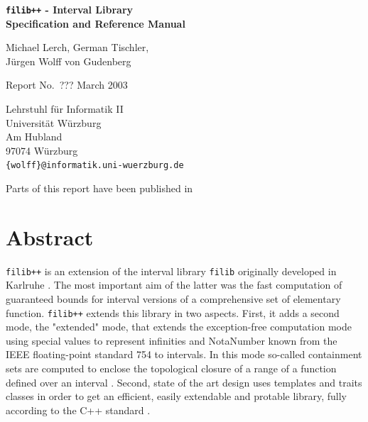 \documentclass{report}
\begin{document}
\begin{titlepage}
\setcounter{page}{0}

\vspace*{5cm}


\hspace{2.25cm}
\begin{minipage}{11.6cm}
\begin{center}
{\LARGE\bf \texttt{filib++} -   Interval Library \\
	  Specification and Reference Manual\\ }

\vspace*{0.9cm}

{\Large\sf Michael Lerch, German Tischler,\\ J\"urgen Wolff von Gudenberg}

\vspace*{1cm}

\hspace*{1.5cm} Report No.\ ??? \hfill March 2003 \hspace*{1.5cm} 


\vspace*{4.5cm}
Lehrstuhl f\"ur Informatik II\\
Universit\"at W\"urzburg\\
Am Hubland\\
97074 W\"urzburg\\[3mm]
{\tt \{wolff\}@informatik.uni-wuerzburg.de}
\end{center}
\vspace*{2cm}
Parts of this report have
	  been published in \cite{rnc, multi}
\end{minipage}

\end{titlepage}

\tableofcontents
\pagebreak
\section*{Abstract}
\texttt{filib++} is an extension of the interval library \texttt{filib}
originally developed in Karlruhe \cite{filib}. The most important aim of the
latter was the fast computation of guaranteed bounds for interval versions of a
comprehensive set of elementary function. \texttt{filib++} extends this library
in two aspects. First, it adds a second mode, the "extended" mode, that
extends the exception-free computation mode using special values to represent
infinities and NotaNumber known from the IEEE floating-point standard 754 to
intervals. In this mode so-called  containment sets are computed to enclose the
topological closure of a range of a function defined over an interval
\cite{ext}. Second, state of the art design uses templates and traits classes
in order to get an efficient, easily extendable and protable library, fully
according to the C++ standard \cite{c++}.
\end{document}
